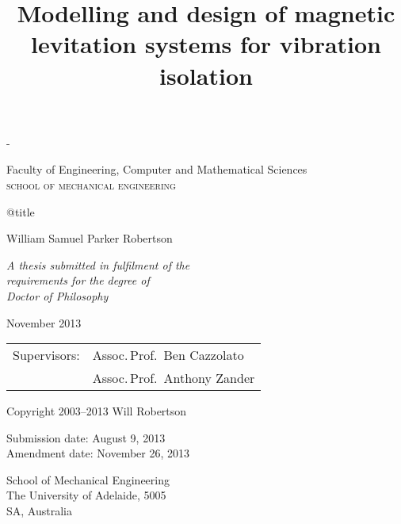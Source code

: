\documentclass[11pt,a4paper]{memoir}
\title{
Modelling and design of magnetic levitation systems for vibration isolation
}
\begin{document}
\pagestyle{empty}
\label{titlepage}
\calccentering{\unitlength}
\begin{adjustwidth*}{\unitlength}{-\unitlength}
\setlength{\parindent}{0pt}

\begin{flushright}
  \hspace*{-1cm}
\end{flushright}

\vfill

Faculty of Engineering,
Computer and Mathematical Sciences\\
\textsc{school of mechanical engineering}

\vfill

\begin{minipage}{0.97\textwidth}
\Large\raggedright\csname @title\endcsname
\end{minipage}

\vspace{10mm}

William Samuel Parker Robertson

\vfill
\vfill

\begin{minipage}{0.50\textwidth}
\raggedright
\itshape
A thesis submitted in fulfilment of the\\ requirements for the degree of\\
Doctor of Philosophy

\bigskip
November 2013
\end{minipage}
\vfill

\end{adjustwidth*}

\clearpage

\null\vfill

\begin{center}

\itshape

  \begin{tabular}{@{}l@{~~}l@{}}
  Supervisors:    & Assoc.\,Prof.\ Ben Cazzolato  \\
                  & Assoc.\,Prof.\ Anthony Zander
  \end{tabular}
  
  \bigskip
  
  Copyright %
  2003--2013 Will Robertson

  \bigskip
  Submission date: August 9, 2013\\
  Amendment date: November 26, 2013


  \bigskip
  School of Mechanical Engineering\\
  The University of Adelaide, 5005\\
  SA, Australia
\end{center}
\end{document}
